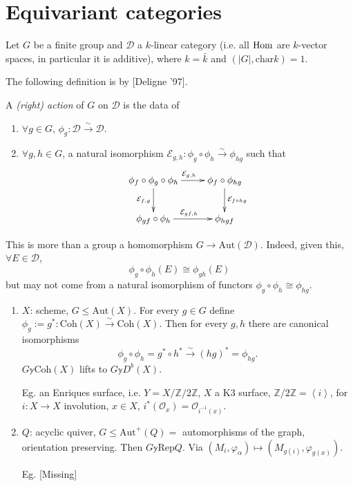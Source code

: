 \section{Equivariant categories}
\label{section-equivariant-categories}

Let $G$ be a finite group and $\mathcal{D}$ a $k$-linear category (i.e. all
$\mathop{\mathrm{Hom}}\nolimits$ are $k$-vector spaces, in particular it is additive), where $k=\bar{k}$
and $(|G|,\text{char}k)=1$.

The following definition is by [Deligne '97].

\begin{definition}
\label{definition-group-action}
A {\it (right) action} of $G$ on $\mathcal{D}$ is the data of
\begin{enumerate}
\item $\forall g \in G$, $\phi_g:\mathcal{D}\xrightarrow{\sim}\mathcal{D}$.
\item $\forall g,h\in G$, a natural isomorphism 
$\mathcal{E}_{g,h}:\phi_g\circ \phi_h \xrightarrow{\sim}\phi_{hg}$ such that
$$
\xymatrix{
\phi_f \circ\phi_g \circ\phi_h
\ar[r]^{\mathcal{E}_{g,h}}\ar[d]_{\mathcal{E}_{f,g}}&\phi_f \circ \phi_{hg}
\ar[d]^{\mathcal{E}_{f \circ hg}}\\
\phi_{gf}\circ \phi_h\ar[r]^{\mathcal{E}_{gf,h}}&\phi_{hgf}
}
$$
\end{enumerate}
\end{definition}

\begin{remark}
\label{remark-more-than-a-homomorphism}
This is more than a group a homomorphism $G \to \text{Aut}(\mathcal{D})$. 
Indeed, given this, $\forall E \in \mathcal{D}$, 
$$
\phi_g \circ \phi_h(E)\cong \phi_{gh}(E)
$$
but may not come from a natural isomorphism of functors
$\phi_g\circ\phi_h\cong\phi_{hg}$.
\end{remark}

\begin{example}
\label{example-group-actions}
\begin{enumerate}
\item $X$: scheme, $G \leq \text{Aut}(X)$. For every $g \in G$ define
$\phi_g:=g^* :\text{Coh}(X)\xrightarrow{\sim}\text{Coh}(X)$. Then for every
$g,h$ there are canonical isomorphisms
$$
\phi_g \circ\phi_h=g^*\circ h^*\xrightarrow{\sim}(hg)^* =\phi_{hg}.
$$
$G \mathbb{y} \text{Coh}(X)$ lifts to $G\mathbb{y}D^b(X)$.

Eg. an Enriques surface, i.e. $Y=X/\mathbb{Z}/2\mathbb{Z}$, $X$ a K3
surface, $\mathbb{Z}/2\mathbb{Z}=\left<i\right>$, for $i:X\to X$ involution, $x
\in X$, $i^* (\mathcal{O}_x)=\mathcal{O}_{i^{-1}(x)}$.

\item $Q$: acyclic quiver, $G\leq \text{Aut}^+(Q)=$ automorphisms of the
graph, orientation preserving. Then $G\mathbb{y}\text{Rep}Q$. Via
$(M_i,\varphi_\alpha)\mapsto (M_{g(i)},\varphi_{g(x)})$.

Eg. [Missing]
\end{enumerate}
\end{example}


